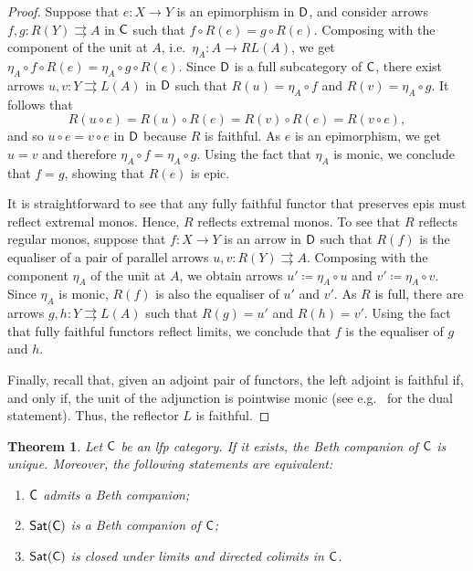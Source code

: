\documentclass[a4paper,10pt,reqno]{amsart}
\newtheorem{theorem}{Theorem}[section]
\theoremstyle{definition}
\theoremstyle{remark}
\newcommand{\cat}{{\sf C}}								%
\newcommand{\catt}{{\sf D}}								%
\newcommand{\Sat}{{\sf Sat}}								%
\begin{document}
\begin{proof}
Suppose that $e\colon X\to Y$ is an epimorphism in $\catt$, and consider arrows $f,g\colon R(Y)\rightrightarrows A$ in $\cat$ such that $f\circ R(e) = g\circ R(e)$. Composing with the component of the unit at $A$, i.e.\ $\eta_{A}\colon A\to RL(A)$, we get $\eta_{A}\circ f\circ R(e) = \eta_{A}\circ g\circ R(e)$. Since $\catt$ is a full subcategory of $\cat$, there exist arrows $u,v\colon Y\rightrightarrows L(A)$ in $\catt$ such that $R(u)=\eta_{A}\circ f$ and $R(v)=\eta_{A}\circ g$. It follows that 
\[
R(u\circ e) = R(u)\circ R(e)= R(v)\circ R(e) = R(v\circ e),
\]
and so $u\circ e = v\circ e$ in $\catt$ because $R$ is faithful. As $e$ is an epimorphism, we get $u=v$ and therefore $\eta_{A}\circ f = \eta_{A}\circ g$. Using the fact that $\eta_{A}$ is monic, we conclude that $f=g$, showing that $R(e)$ is epic.

It is straightforward to see that any fully faithful functor that preserves epis must reflect extremal monos. Hence, $R$ reflects extremal monos. 
%
To see that $R$ reflects regular monos, suppose that $f\colon X\to Y$ is an arrow in $\catt$ such that $R(f)$ is the equaliser of a pair of parallel arrows $u,v\colon R(Y)\rightrightarrows A$. 
Composing with the component $\eta_{A}$ of the unit at $A$, we obtain arrows $u'\coloneqq \eta_{A}\circ u$ and $v'\coloneqq \eta_{A}\circ v$. Since $\eta_{A}$ is monic, $R(f)$ is also the equaliser of $u'$ and $v'$. As $R$ is full, there are arrows $g,h\colon Y\rightrightarrows L(A)$ such that $R(g)=u'$ and $R(h)=v'$. Using the fact that fully faithful functors reflect limits, we conclude that $f$ is the equaliser of $g$ and $h$.

Finally, recall that, given an adjoint pair of functors, the left adjoint is faithful if, and only if, the unit of the adjunction is pointwise monic (see e.g.\ \cite[Theorem~19.14(1)]{ahs06book} for the dual statement). Thus, the reflector $L$ is faithful.
\end{proof}
 
\begin{theorem}\label{t:Beth-companion-unique} 
Let $\cat$ be an lfp category. If it exists, the Beth companion of $\cat$ is unique. Moreover, the following statements are equivalent:
\begin{enumerate}[label=(\arabic*)]
\item\label{i:has-Beth-comp} $\cat$ admits a Beth companion;
\item\label{i:Beth-comp-is-Sigma} $\Sat(\cat)$ is a Beth companion of $\cat$;
\item\label{i:Sigma-axiomatisable} $\Sat(\cat)$ is closed under limits and directed colimits in $\cat$.
\end{enumerate}
\end{theorem}
\end{document}
